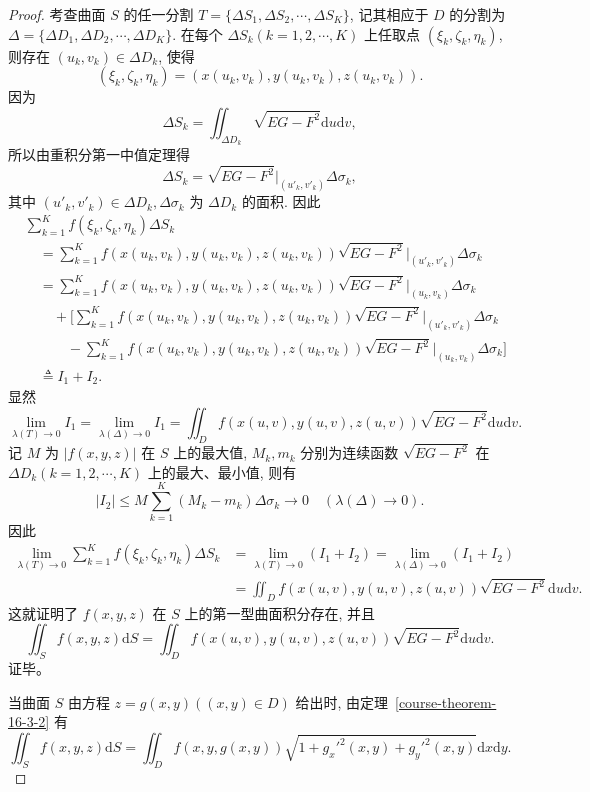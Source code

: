 \documentclass[UTF8,12pt,a4paper,fontset=fandol]{ctexart}
\begin{document}
\begin{proof}\quad 考查曲面 $S$ 的任一分割 $T=\{\Delta S_1,\Delta S_2,\cdots,\Delta S_K\}$, 记其相应于 $D$ 的分割为 $\Delta=\{\Delta D_1,\Delta D_2,\cdots,\Delta D_K\}$. 在每个 $\Delta S_k(k=1,2,\cdots,K)$ 上任取点 $(\xi_k,\zeta_k,\eta_k)$, 则存在 $(u_k,v_k)\in\Delta D_k$, 使得
\[
  (\xi_k,\zeta_k,\eta_k)=(x(u_k,v_k),y(u_k,v_k),z(u_k,v_k)).
\]
因为
\[
  \Delta S_k=\iint_{\Delta D_k}\sqrt{EG-F^2}\mathrm du\mathrm dv,
\]
所以由重积分第一中值定理得
\[
  \Delta S_k=\sqrt{EG-F^2}\bigg|_{(u'_k,v'_k)}\Delta\sigma_k,
\]
其中 $(u'_k,v'_k)\in\Delta D_k,\Delta\sigma_k$ 为 $\Delta D_k$ 的面积. 因此
\[
\begin{aligned}
  &\sum_{k=1}^K f(\xi_k,\zeta_k,\eta_k)\Delta S_k\\
  &\quad=\sum_{k=1}^K f(x(u_k,v_k),y(u_k,v_k),z(u_k,v_k))
    \sqrt{EG-F^2}\bigg|_{(u'_k,v'_k)}\Delta\sigma_k\\
  &\quad=\sum_{k=1}^K f(x(u_k,v_k),y(u_k,v_k),z(u_k,v_k))
    \sqrt{EG-F^2}\bigg|_{(u_k,v_k)}\Delta\sigma_k\\
  &\qquad+\bigg[
    \sum_{k=1}^K f(x(u_k,v_k),y(u_k,v_k),z(u_k,v_k))
    \sqrt{EG-F^2}\bigg|_{(u'_k,v'_k)}\Delta\sigma_k\\
  &\qquad\quad-
    \sum_{k=1}^K f(x(u_k,v_k),y(u_k,v_k),z(u_k,v_k))
    \sqrt{EG-F^2}\bigg|_{(u_k,v_k)}\Delta\sigma_k
  \bigg]\\
  &\quad\triangleq I_1+I_2.
\end{aligned}
\]
显然
\[
  \lim_{\lambda(T)\to0}I_1=\lim_{\lambda(\Delta)\to0}I_1
  =\iint_D f(x(u,v),y(u,v),z(u,v))\sqrt{EG-F^2}\mathrm du\mathrm dv.
\]
记 $M$ 为 $|f(x,y,z)|$ 在 $S$ 上的最大值, $M_k,m_k$ 分别为连续函数 $\sqrt{EG-F^2}$ 在 $\Delta D_k(k=1,2,\cdots,K)$ 上的最大、最小值, 则有
\[
  |I_2|\leqslant M\sum_{k=1}^K(M_k-m_k)\Delta\sigma_k\to0
  \quad(\lambda(\Delta)\to0).
\]
因此
\[
\begin{aligned}
  \lim_{\lambda(T)\to0}\sum_{k=1}^K f(\xi_k,\zeta_k,\eta_k)\Delta S_k
  &=\lim_{\lambda(T)\to0}(I_1+I_2)
    =\lim_{\lambda(\Delta)\to0}(I_1+I_2)\\
  &=\iint_D f(x(u,v),y(u,v),z(u,v))\sqrt{EG-F^2}\mathrm du\mathrm dv.
\end{aligned}
\]
这就证明了 $f(x,y,z)$ 在 $S$ 上的第一型曲面积分存在, 并且
\[
  \iint_S f(x,y,z)\mathrm dS
  =\iint_D f(x(u,v),y(u,v),z(u,v))\sqrt{EG-F^2}\mathrm du\mathrm dv.
\]
证毕。

当曲面 $S$ 由方程 $z=g(x,y)((x,y)\in D)$ 给出时, 由定理~\ref{course-theorem-16-3-2}  有
\[
  \iint_S f(x,y,z)\mathrm dS
  =\iint_D f(x,y,g(x,y))\sqrt{1+g_x'^2(x,y)+g_y'^2(x,y)}\mathrm dx\mathrm dy.
\]

\end{proof}
\end{document}
